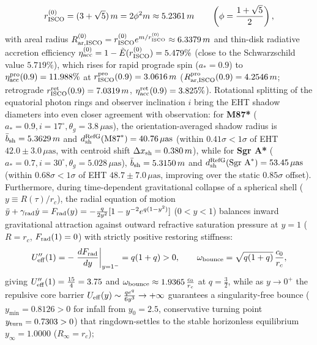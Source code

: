 \documentclass[11pt,a4paper]{article}
\begin{document}
\begin{enumerate}[label=\arabic*.]
\begin{equation}
r_{\rm ISCO}^{(0)} = (3 + \sqrt{5})\,m = 2\phi^2 m \approx 5.2361\,m \qquad \left(\phi = \frac{1+\sqrt{5}}{2}\right),
\end{equation}
with areal radius $R_{\rm ar, ISCO}^{(0)} = r_{\rm ISCO}^{(0)}e^{m/r_{\rm ISCO}^{(0)}} \approx 6.3379\,m$ and thin-disk radiative accretion efficiency $\eta_{\rm acc}^{(0)} = 1 - \tilde{E}(r_{\rm ISCO}^{(0)}) = 5.479\%$ (close to the Schwarzschild value $5.719\%$), which rises for rapid prograde spin ($a_* = 0.9$) to $\eta_{\rm acc}^{\rm pro}(0.9) = 11.988\%$ at $r_{\rm ISCO}^{\rm pro}(0.9) = 3.0616\,m$ ($R_{\rm ar, ISCO}^{\rm pro}(0.9) = 4.2546\,m$; retrograde $r_{\rm ISCO}^{\rm ret}(0.9) = 7.0319\,m$, $\eta_{\rm acc}^{\rm ret}(0.9) = 3.825\%$). Rotational splitting of the equatorial photon rings and observer inclination $i$ bring the EHT shadow diameters into even closer agreement with observation: for \textbf{M87*} ($a_* = 0.9, i = 17^\circ, \theta_g = 3.8\,\mu\text{as}$), the orientation-averaged shadow radius is $\bar{b}_{\rm sh} = 5.3629\,m$ and \textbf{$d_{\rm sh}^{\rm RefG}(\text{M87}^*) = 40.76\,\mu\text{as}$} (within \textbf{$0.41\sigma < 1\sigma$} of EHT $42.0 \pm 3.0\,\mu\text{as}$, with centroid shift $\Delta x_{\rm sh} = 0.380\,m$), while for \textbf{Sgr A*} ($a_* = 0.7, i = 30^\circ, \theta_g = 5.028\,\mu\text{as}$), $\bar{b}_{\rm sh} = 5.3150\,m$ and \textbf{$d_{\rm sh}^{\rm RefG}(\text{Sgr A}^*) = 53.45\,\mu\text{as}$} (within \textbf{$0.68\sigma < 1\sigma$} of EHT $48.7 \pm 7.0\,\mu\text{as}$, improving over the static $0.85\sigma$ offset). Furthermore, during time-dependent gravitational collapse of a spherical shell ($y \equiv R(\tau)/r_c$), the radial equation of motion $\ddot{y} + \gamma_{\rm rad}\dot{y} = F_{\rm rad}(y) = -\frac{q}{2y^2}[1 - y^{-2}e^{q(1-y^2)}]$ ($0 < y < 1$) balances inward gravitational attraction against outward refractive saturation pressure at $y = 1$ ($R = r_c$, $F_{\rm rad}(1) = 0$) with strictly positive restoring stiffness:
\begin{equation}
U_{\rm eff}''(1) = -\left.\frac{dF_{\rm rad}}{dy}\right|_{y=1^-} = q(1 + q) > 0, \qquad \omega_{\rm bounce} = \sqrt{q(1+q)}\,\frac{c_0}{r_c},
\end{equation}
giving $U_{\rm eff}''(1) = \frac{15}{4} = 3.75$ and $\omega_{\rm bounce} \approx 1.9365\,\frac{c_0}{r_c}$ at $q = \frac{3}{2}$, while as $y \to 0^+$ the repulsive core barrier $U_{\rm eff}(y) \sim \frac{q e^q}{6 y^3} \to +\infty$ guarantees a singularity-free bounce ($y_{\min} = 0.8126 > 0$ for infall from $y_0 = 2.5$, conservative turning point $y_{\rm turn} = 0.7303 > 0$) that ringdown-settles to the stable horizonless equilibrium $y_\infty = 1.0000$ ($R_\infty = r_c$);

\end{enumerate}
\end{document}
